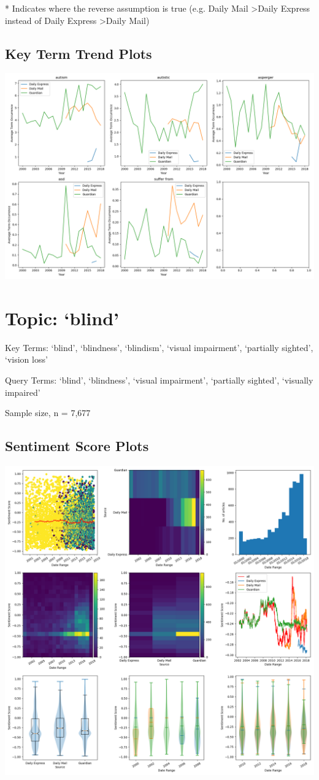 \documentclass{report}
\begin{document}
\noindent ** Indicates where the reverse assumption is true (e.g. Daily Mail \textgreater\space Daily Express instead of Daily Express \textgreater\space Daily Mail)

\subsection{Key Term Trend Plots}
\includegraphics[width=\textwidth]{raw/autism-terms.png}

\newpage
\section{Topic: `blind'}
Key Terms: `blind', `blindness', `blindism', `visual impairment', `partially sighted', `vision loss'

\noindent Query Terms: `blind', `blindness', `visual impairment', `partially sighted', `visually impaired'

\noindent Sample size, n = 7,677

\subsection{Sentiment Score Plots}
\includegraphics[width=\textwidth]{raw/blind.png}
\end{document}
